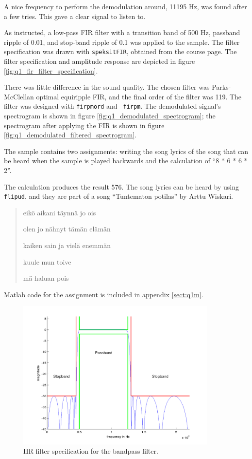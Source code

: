 A nice frequency to perform the demodulation around, 11195 Hz, was found
after a few tries.  This gave a clear signal to listen to.

As instructed, a low-pass FIR filter with a transition band of 500 Hz,
passband ripple of 0.01, and stop-band ripple of 0.1 was applied to the
sample.  The filter specification was drawn with {\tt speksitFIR},
obtained from the course page.  The filter specification and amplitude
response are depicted in figure \ref{fig:q1_fir_filter_specification}.

There was little difference in the sound quality.  The chosen filter was
Parks-McClellan optimal equiripple FIR, and the final order of the
filter was 119.  The filter was designed with {\tt firpmord} and {\tt
firpm}.  The demodulated signal's spectrogram is shown in
figure \ref{fig:q1_demodulated_spectrogram}; the spectrogram after
applying the FIR is shown in
figure \ref{fig:q1_demodulated_filtered_spectrogram}.

The sample contains two assignments: writing the song lyrics of the song
that can be heard when the sample is played backwards and the
calculation of ``8 * 6 * 6 * 2''.

The calculation produces the result 576.  The song lyrics can be heard
by using {\tt flipud}, and they are part of a song ``Tuntematon
potilas'' by Arttu Wiskari\cite{wiskari2010}.

\begin{quotation}
eikö aikani täynnä jo ois

olen jo nähnyt tämän elämän

kaiken sain ja vielä enemmän

kuule mun toive

mä haluan pois
\end{quotation}

Matlab code for the assignment is included in appendix \ref{sect:q1m}.


\begin{figure}[]
  \begin{center}
    \hspace*{-1in}
    \includegraphics[width=100mm]{q1_iir_filter_specification}
    \caption{IIR filter specification for the
      bandpass filter. \label{fig:q1_iir_filter_specification}}
  \end{center}  
\end{figure}


